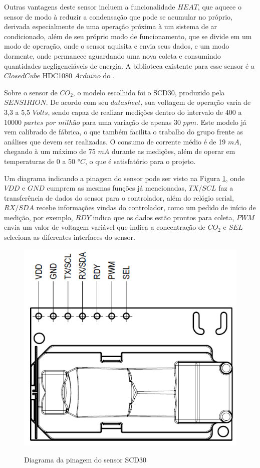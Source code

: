 \documentclass[acronym,symbols]{fei}
\begin{document}
Outras vantagens deste sensor incluem a funcionalidade $HEAT$, que aquece o sensor de modo à reduzir a condensação que pode se acumular no próprio, derivada especialmente de uma operação próxima à um sistema de ar condicionado, além de seu próprio modo de funcionamento, que se divide em um modo de operação, onde o sensor aquisita e envia seus dados, e um modo dormente, onde permanece aguardando uma nova coleta e consumindo quantidades negligenciáveis de energia. A biblioteca existente para esse sensor é a $ClosedCube$ HDC1080 $Arduino$ do \textcite{ClosedCubeHDC1080}.

Sobre o sensor de $CO_2$, o modelo escolhido foi o SCD30, produzido pela $SENSIRION$. De acordo com seu $datasheet$, sua voltagem de operação varia de 3,3 a 5,5 $Volts$, sendo capaz de realizar medições dentro do intervalo de 400 a 10000 $partes$ $por$ $milhão$ para uma variação de apenas 30 $ppm$. Este modelo já vem calibrado de fábrica, o que também facilita o trabalho do grupo frente as análises que devem ser realizadas. O consumo de corrente médio é de 19 $mA$, chegando à um máximo de 75 $mA$ durante as medições, além de operar em temperaturas de 0 a 50 $°C$, o que é satisfatório para o projeto. 

Um diagrama indicando a pinagem do sensor pode ser visto na Figura \ref{fig:PinCO2}, onde $VDD$ e $GND$ cumprem as mesmas funções já mencionadas, $TX/SCL$ faz a transferência de dados do sensor para o controlador, além do relógio serial, $RX/SDA$ recebe informações vindas do controlador, como um pedido de início de medição, por exemplo, $RDY$ indica que os dados estão prontos para coleta, $PWM$ envia um valor de voltagem variável que indica a concentração de $CO_2$ e $SEL$ seleciona as diferentes interfaces do sensor.

\begin{figure}[!htb]
\centering
    \caption{Diagrama da pinagem do sensor SCD30}
    \includegraphics[width=0.6\linewidth]{Imagens/PinCO2.png}
    \label{fig:PinCO2}
\end{figure}
\end{document}
